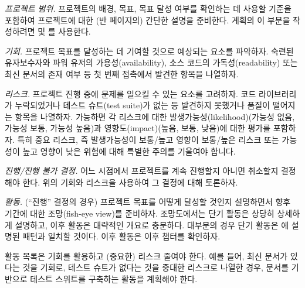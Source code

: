 \documentclass[a4paper,10pt,twoside]{book}
\begin{document}
\begin{bulletlist}
  \item \emph{프로젝트 범위.}
프로젝트의 배경, 목표, 목표 달성 여부를 확인하는 데 사용할 기준을 포함하여 프로젝트에 대한 (반 페이지의) 간단한 설명을 준비한다. 계획의 이 부분을 작성하려면  및 를 사용한다.

  \item \emph{기회.}
프로젝트 목표를 달성하는 데 기여할 것으로 예상되는 요소를 파악하자. 숙련된 유자보수자와 파워 유저의 가용성(availability), 소스 코드의 가독성(readability) 또는 최신 문서의 존재 여부 등 첫 번째 접촉에서 발견한 항목을 나열하자.

  \item \emph{리스크.}
프로젝트 진행 중에 문제를 일으킬 수 있는 요소를 고려하자. 코드 라이브러리가 누락되었거나 테스트 슈트(test suite)가 없는 등 발견하지 못했거나 품질이 떨어지는 항목을 나열하자. 가능하면 각 리스크에 대한 발생가능성(likelihood)(가능성 없음, 가능성 보통, 가능성 높음)과 영향도(impact)(높음, 보통, 낮음)에 대한 평가를 포함하자. 특히 중요 리스크, 즉 발생가능성이 보통/높고 영향이 보통/높은 리스크 또는 가능성이 높고 영향이 낮은 위험에 대해 특별한 주의를 기울여야 합니다.

  \item \emph{진행/진행 불가 결정.}
어느 시점에서 프로젝트를 계속 진행할지 아니면 취소할지 결정해야 한다. 위의 기회와 리스크을 사용하여 그 결정에 대해 토론하자.

  \item \emph{활동.}
(``진행'' 결정의 경우) 프로젝트 목표를 어떻게 달성할 것인지 설명하면서 향후 기간에 대한 조망(fish-eye view)를 준비하자. 조망도에서는 단기 활동은 상당히 상세하게 설명하고, 이후 활동은 대략적인 개요로 충분하다. 대부분의 경우 단기 활동은 에 설명된 패턴과 일치할 것이다. 이후 활동은 이후 챕터를 확인하자.

활동 목록은 기회를 활용하고 (중요한) 리스크 줄여야 한다. 예를 들어, 최신 문서가 있다는 것을 기회로, 테스트 슈트가 없다는 것을 중대한 리스크로 나열한 경우, 문서를 기반으로 테스트 스위트를 구축하는 활동을 계획해야 한다.

\end{bulletlist}


\end{document}
